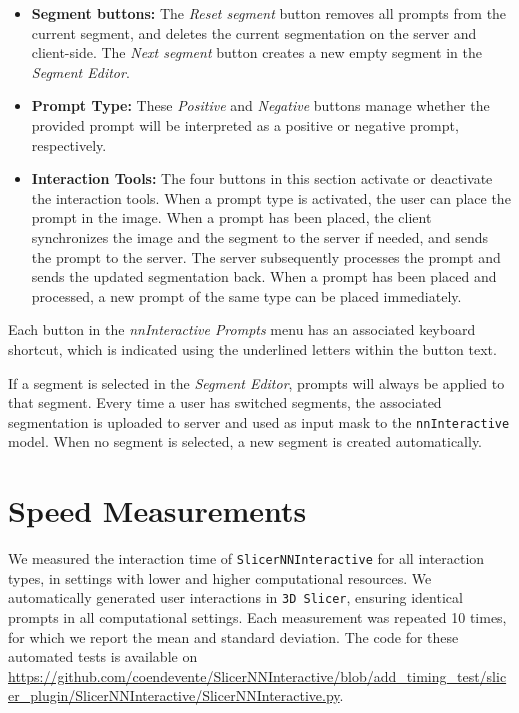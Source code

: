 \documentclass[
]{article}
\begin{document}
\begin{itemize}
\item
  \textbf{Segment buttons:} The \emph{Reset segment} button removes all
  prompts from the current segment, and deletes the current segmentation
  on the server and client-side. The \emph{Next segment} button creates
  a new empty segment in the \emph{Segment Editor}.
\item
  \textbf{Prompt Type:} These \emph{Positive} and \emph{Negative}
  buttons manage whether the provided prompt will be interpreted as a
  positive or negative prompt, respectively.
\item
  \textbf{Interaction Tools:} The four buttons in this section activate
  or deactivate the interaction tools. When a prompt type is activated,
  the user can place the prompt in the image. When a prompt has been
  placed, the client synchronizes the image and the segment to the
  server if needed, and sends the prompt to the server. The server
  subsequently processes the prompt and sends the updated segmentation
  back. When a prompt has been placed and processed, a new prompt of the
  same type can be placed immediately.
\end{itemize}

Each button in the \emph{nnInteractive Prompts} menu has an associated
keyboard shortcut, which is indicated using the underlined letters
within the button text.

If a segment is selected in the \emph{Segment Editor}, prompts will
always be applied to that segment. Every time a user has switched
segments, the associated segmentation is uploaded to server and used as
input mask to the \texttt{nnInteractive} model. When no segment is
selected, a new segment is created automatically.

\section{Speed Measurements}\label{speed-measurements}

We measured the interaction time of \texttt{SlicerNNInteractive} for all
interaction types, in settings with lower and higher computational
resources. We automatically generated user interactions in
\texttt{3D\ Slicer}, ensuring identical prompts in all computational
settings. Each measurement was repeated 10 times, for which we report
the mean and standard deviation. The code for these automated tests is
available on
\url{https://github.com/coendevente/SlicerNNInteractive/blob/add_timing_test/slicer_plugin/SlicerNNInteractive/SlicerNNInteractive.py}.
\end{document}
